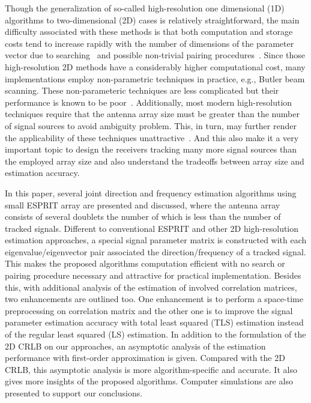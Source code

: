 \documentclass[conference]{IEEEtran}
\begin{document}
Though the generalization of so-called high-resolution one
dimensional (1D) algorithms to two-dimensional (2D) cases is
relatively straightforward, the main difficulty associated with
these methods is that both computation and storage costs tend to
increase rapidly with the number of dimensions of the parameter
vector due to searching~\cite{Wong97,Bro98} and possible
non-trivial pairing procedures~\cite{Veen92,Kedi96}. Since those
high-resolution 2D methods have a considerably higher
computational cost, many implementations employ non-parametric
techniques in practice, e.g., Butler beam scanning. These
non-parameteric techniques are less complicated but their
performance is known to be poor~\cite{Goda97}. Additionally, most
modern high-resolution techniques require that the antenna array
size must be greater than the number of signal sources to avoid
ambiguity problem. This, in turn, may further render the
applicability of these techniques unattractive~\cite{Wang98}. And
this also make it a very important topic to design the receivers
tracking many more signal sources than the employed array size and
also understand the tradeoffs between array size and estimation
accuracy.

In this paper, several joint direction and frequency estimation
algorithms using small ESPRIT array are presented and discussed,
where the antenna array consists of several doublets the number of
which is less than the number of tracked signals. Different to
conventional ESPRIT and other 2D high-resolution estimation
approaches, a special signal parameter matrix is constructed with
each eigenvalue/eigenvector pair associated the
direction/frequency of a tracked signal. This makes the proposed
algorithms computation efficient with no search or pairing
procedure necessary and attractive for practical implementation.
Besides this, with additional analysis of the estimation of
involved correlation matrices, two enhancements are outlined too.
One enhancement is to perform a space-time preprocessing on
correlation matrix and the other one is to improve the signal
parameter estimation accuracy with total least squared (TLS)
estimation instead of the regular least squared (LS) estimation.
In addition to the formulation of the 2D CRLB on our approaches,
an asymptotic analysis of the estimation performance with
first-order approximation is given. Compared with the 2D CRLB,
this asymptotic analysis is more algorithm-specific and accurate.
It also gives more insights of the proposed algorithms. Computer
simulations are also presented to support our conclusions.
\end{document}
